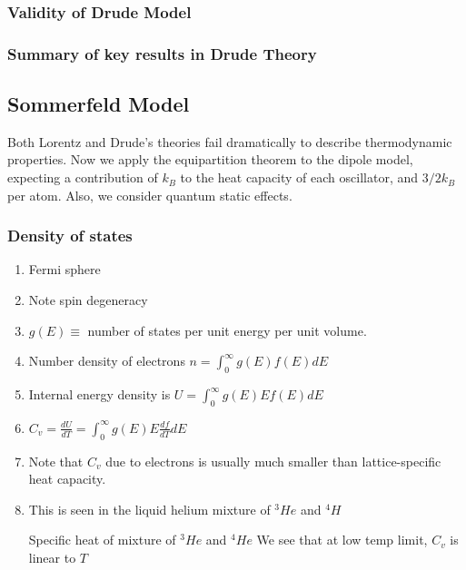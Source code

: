 \documentclass[12pt,a4paper]{article}
\begin{document}
    \subsubsection{Validity of Drude Model}
    \subsubsection{Summary of key results in Drude Theory}
    \subsection{Sommerfeld Model}
        Both Lorentz and Drude's theories fail dramatically to describe thermodynamic properties. 
        Now we apply the equipartition theorem to the dipole model, expecting a contribution of $k_B$ to the heat capacity of each oscillator, and $3/2k_B$ per atom.
        Also, we consider quantum static effects.
        \subsubsection{Density of states}
            \begin{enumerate}
                \item Fermi sphere
                \item Note spin degeneracy 
                \item $g(E)\equiv$ number of states per unit energy per unit volume.
                \item Number density of electrons $n=\int_0^\infty g(E)f(E)dE$
                \item Internal energy density is $U=\int_0^\infty g(E)E f(E)dE$
                \item $C_v=\frac{dU}{dT}=\int_0^\infty g(E)E\frac{df}{dT}dE$
                \item Note that $C_v$ due to electrons is usually much smaller than lattice-specific heat capacity.
                \item {This is seen in the liquid helium mixture of ${}^{3}He$ and ${}^{4}H$
                \begin{example}
                    {Specific heat of mixture of ${}^{3}He$ and ${}^{4}He$}
                    {We see that at low temp limit, $C_v$ is linear to $T$}
                \end{example}
                }
            \end{enumerate}
\end{document}
